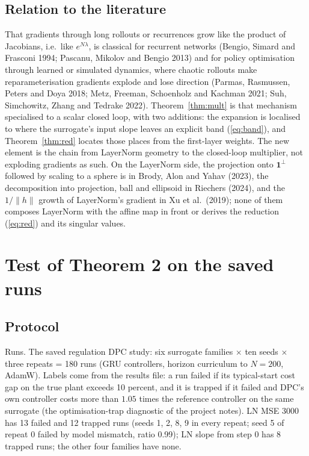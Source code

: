 \documentclass[11pt]{article}
\theoremstyle{plainnote}
\newcommand{\one}{\mathbf 1}
\begin{document}
\subsection{Relation to the literature}
That gradients through long rollouts or recurrences grow like the product of Jacobians, i.e.\ like $e^{N\lambda}$, is classical for recurrent networks (Bengio, Simard and Frasconi 1994; Pascanu, Mikolov and Bengio 2013) and for policy optimisation through learned or simulated dynamics, where chaotic rollouts make reparameterisation gradients explode and lose direction (Parmas, Rasmussen, Peters and Doya 2018; Metz, Freeman, Schoenholz and Kachman 2021; Suh, Simchowitz, Zhang and Tedrake 2022). Theorem~\ref{thm:mult} is that mechanism specialised to a scalar closed loop, with two additions: the expansion is localised to where the surrogate's input slope leaves an explicit band (\ref{eq:band}), and Theorem~\ref{thm:red} locates those places from the first-layer weights. The new element is the chain from LayerNorm geometry to the closed-loop multiplier, not exploding gradients as such. On the LayerNorm side, the projection onto $\one^\perp$ followed by scaling to a sphere is in Brody, Alon and Yahav (2023), the decomposition into projection, ball and ellipsoid in Riechers (2024), and the $1/\|h\|$ growth of LayerNorm's gradient in Xu et al.\ (2019); none of them composes LayerNorm with the affine map in front or derives the reduction (\ref{eq:red}) and its singular values.

\section{Test of Theorem 2 on the saved runs}\label{sec:test}

\subsection{Protocol}
Runs. The saved regulation DPC study: six surrogate families $\times$ ten seeds $\times$ three repeats = 180 runs (GRU controllers, horizon curriculum to $N=200$, AdamW). Labels come from the results file: a run failed if its typical-start cost gap on the true plant exceeds 10 percent, and it is trapped if it failed and DPC's own controller costs more than $1.05$ times the reference controller on the same surrogate (the optimisation-trap diagnostic of the project notes). LN MSE 3000 has 13 failed and 12 trapped runs (seeds 1, 2, 8, 9 in every repeat; seed 5 of repeat 0 failed by model mismatch, ratio 0.99); LN slope from step 0 has 8 trapped runs; the other four families have none.
\end{document}
